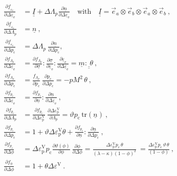 \documentclass[paper=a4, twoside, pagesize]{scrartcl}
\newcommand{\tensor}[1]{\underline{#1}}
\newcommand{\tensorf}[1]{\underline{\underline{#1}}}
\renewcommand{\c}{\text{c}}
\newcommand{\e}{\text{e}}
\newcommand{\p}{\text{p}}
\newcommand{\with}{\text{with}}
\newcommand{\trace}{\mathrm{tr}}
\newcommand{\dyad}{\otimes}
\begin{document}
\begin{subequations}\label{eqset:partialDerivatives}
\begin{align}
  \frac{\partial\tensor f_{\!\varepsilon_\e}}{\partial\varDelta\tensor\varepsilon_\e} &= \tensorf I + \varDelta\varLambda_p\frac{\partial\tensor n}{\partial\varDelta\tensor\varepsilon_\e} \quad\with\quad \tensorf I=\vec e_a\dyad\vec e_b\dyad\vec e_a\dyad\vec e_b \ ,
  \\
  \frac{\partial\tensor f_{\!\varepsilon_\e}}{\partial\varDelta\varLambda_p} &= \tensor n\ ,
  \\
  \frac{\partial\tensor f_{\!\varepsilon_\e}}{\partial\varDelta p_\c} &= \varDelta\varLambda_p \ \frac{\partial\tensor n}{\partial\varDelta p_\c} ,
  \\[2mm]
  \frac{\partial f_{\!\varLambda_p}}{\partial\varDelta\tensor\varepsilon_\e} &= \frac{\partial f_{\!\varLambda_p}}{\partial \tensor\sigma} : \frac{\partial \tensor\sigma}{\partial \tensor\varepsilon_\e} : \frac{\partial\tensor\varepsilon_\e}{\partial\varDelta\tensor\varepsilon_\e} = \tensor m : \tensorf\ \theta\ , %
  \\
  \frac{\partial f_{\!\varLambda_p}}{\partial\varDelta p_\c} &= \frac{f_{\!\varLambda_p}}{\partial p_\c}\ \frac{\partial p_\c}{\partial \varDelta p_\c}
                                                              = -p M^2\, \theta\ , 
  \\[2mm]
  \frac{\partial f_{p_\c}}{\partial\varDelta\tensor\varepsilon_\e} &= \frac{\partial f_{p_\c}}{\partial\tensor n} : \frac{\partial\tensor n}{\partial\varDelta\tensor\varepsilon_\e}\ , 
  \\
  \frac{\partial f_{p_\c}}{\partial\varDelta\varLambda_p} &= \frac{\partial f_{p_\c}}{\partial\varDelta\varepsilon_\p^\text{V}}\ \frac{\partial\varDelta\varepsilon_\p^\text{V}}{\partial\varLambda_p} = \vartheta p_\c\,\trace(\tensor n)\ ,
  \\
  \frac{\partial f_{p_\c}}{\partial\varDelta p_\c} &= 1 + \vartheta\varDelta\varepsilon_\p^\text{V}\theta + \frac{\partial f_{p_\c}}{\partial\tensor n} : \frac{\partial\tensor n}{\partial\varDelta p_\c}\ ,
  \\
  \frac{\partial f_{p_\c}}{\partial\varDelta\phi} &= \varDelta\varepsilon_\p^\text{V} p_\c \frac{\partial\vartheta(\phi)}{\partial\phi}\ \frac{\partial\phi}{\partial\varDelta\phi} 
                                                   = \frac{\varDelta\varepsilon_\p^\text{V} p_\c\,\theta }{(\lambda - \kappa)(1 - \phi)^2}\ 
                                                   = \frac{\varDelta\varepsilon_\p^\text{V} p_\c\,\vartheta\,\theta }{(1 - \phi)}\ , 
  \\[2mm]
  \frac{\partial f_{\phi}}{\partial\varDelta\phi} &= 1 + \theta\varDelta\varepsilon^\text{V} \ .
\end{align}
\end{subequations}
\end{document}
